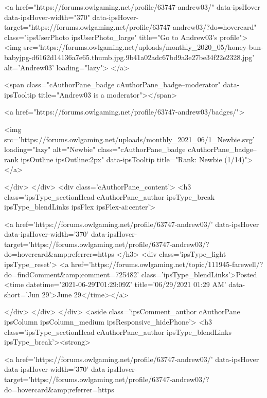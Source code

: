 	<a href="https://forums.owlgaming.net/profile/63747-andrew03/" data-ipsHover data-ipsHover-width="370" data-ipsHover-target="https://forums.owlgaming.net/profile/63747-andrew03/?do=hovercard" class="ipsUserPhoto ipsUserPhoto_large" title="Go to Andrew03's profile">
		<img src='https://forums.owlgaming.net/uploads/monthly_2020_05/honey-bun-babyjpg-d6162d14136a7e65.thumb.jpg.9b41a02adc67bd9a3e27be34f22e2328.jpg' alt='Andrew03' loading="lazy">
	</a>

				
				<span class="cAuthorPane_badge cAuthorPane_badge--moderator" data-ipsTooltip title="Andrew03 is a moderator"></span>
				
				
					<a href="https://forums.owlgaming.net/profile/63747-andrew03/badges/">
						
<img src='https://forums.owlgaming.net/uploads/monthly_2021_06/1_Newbie.svg' loading="lazy" alt="Newbie" class="cAuthorPane_badge cAuthorPane_badge--rank ipsOutline ipsOutline:2px" data-ipsTooltip title="Rank: Newbie (1/14)">
					</a>
				
			</div>
		</div>
		<div class='cAuthorPane_content'>
			<h3 class='ipsType_sectionHead cAuthorPane_author ipsType_break ipsType_blendLinks ipsFlex ipsFlex-ai:center'>
				


<a href='https://forums.owlgaming.net/profile/63747-andrew03/' data-ipsHover data-ipsHover-width='370' data-ipsHover-target='https://forums.owlgaming.net/profile/63747-andrew03/?do=hovercard&amp;referrer=https%
			</h3>
			<div class='ipsType_light ipsType_reset'>
				<a href='https://forums.owlgaming.net/topic/111945-farewell/?do=findComment&amp;comment=725482' class='ipsType_blendLinks'>Posted <time datetime='2021-06-29T01:29:09Z' title='06/29/2021 01:29  AM' data-short='Jun 29'>June 29</time></a>
				
			</div>
		</div>
	</div>
	<aside class='ipsComment_author cAuthorPane ipsColumn ipsColumn_medium ipsResponsive_hidePhone'>
		<h3 class='ipsType_sectionHead cAuthorPane_author ipsType_blendLinks ipsType_break'><strong>


<a href='https://forums.owlgaming.net/profile/63747-andrew03/' data-ipsHover data-ipsHover-width='370' data-ipsHover-target='https://forums.owlgaming.net/profile/63747-andrew03/?do=hovercard&amp;referrer=https%
			
